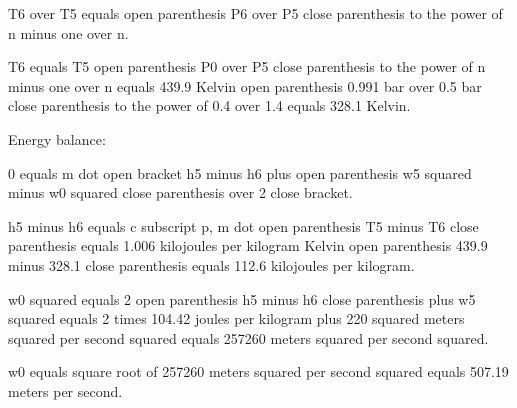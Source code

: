 T6 over T5 equals open parenthesis P6 over P5 close parenthesis to the power of n minus one over n.

T6 equals T5 open parenthesis P0 over P5 close parenthesis to the power of n minus one over n equals 439.9 Kelvin open parenthesis 0.991 bar over 0.5 bar close parenthesis to the power of 0.4 over 1.4 equals 328.1 Kelvin.

Energy balance:

0 equals m dot open bracket h5 minus h6 plus open parenthesis w5 squared minus w0 squared close parenthesis over 2 close bracket.

h5 minus h6 equals c subscript p, m dot open parenthesis T5 minus T6 close parenthesis equals 1.006 kilojoules per kilogram Kelvin open parenthesis 439.9 minus 328.1 close parenthesis equals 112.6 kilojoules per kilogram.

w0 squared equals 2 open parenthesis h5 minus h6 close parenthesis plus w5 squared equals 2 times 104.42 joules per kilogram plus 220 squared meters squared per second squared equals 257260 meters squared per second squared.

w0 equals square root of 257260 meters squared per second squared equals 507.19 meters per second.
